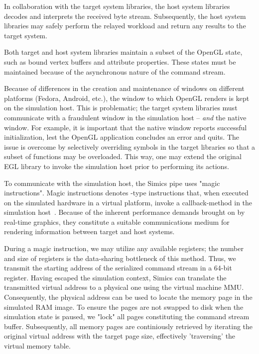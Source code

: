In collaboration with the target system libraries, the host system libraries decodes and interprets the received byte stream.
Subsequently, the host system libraries may safely perform the relayed workload and return any results to the target system.

Both target and host system libraries maintain a subset of the OpenGL state, such as bound vertex buffers and attribute properties.
These states must be maintained because of the asynchronous nature of the command stream.

Because of differences in the creation and maintenance of windows on different platforms (Fedora, Android, etc.), the window to which OpenGL renders is kept on the simulation host.
This is problematic; the target system libraries must communicate with a fraudulent window in the simulation host -- \textit{and} the native window.
For example, it is important that the native window reports successful initialization, lest the OpenGL application concludes an error and quits.
The issue is overcome by selectively overriding symbols in the target libraries so that a subset of functions may be overloaded.
This way, one may extend the original EGL library to invoke the simulation host prior to performing its actions.

To communicate with the simulation host, the Simics pipe uses "magic instructions".
Magic instructions denotes -type instructions that, when executed on the simulated hardware in a virtual platform, invoke a callback-method in the simulation host~.
Because of the inherent performance demands brought on by real-time graphics, they constitute a suitable communications medium for rendering information between target and host systems.

During a magic instruction, we may utilize any available registers; the number and size of registers is the data-sharing bottleneck of this method.
Thus, we transmit the starting address of the serialized command stream in a 64-bit register.
Having escaped the simulation context, Simics can translate the transmitted virtual address to a physical one using the virtual machine MMU.
Consequently, the physical address can be used to locate the memory page in the simulated RAM image.
To ensure the pages are not swapped to disk when the simulation state is paused, we "lock" all pages constituting the command stream buffer.
Subsequently, all memory pages are continiously retrieved by iterating the original virtual address with the target page size, effectively 'traversing' the virtual memory table.

